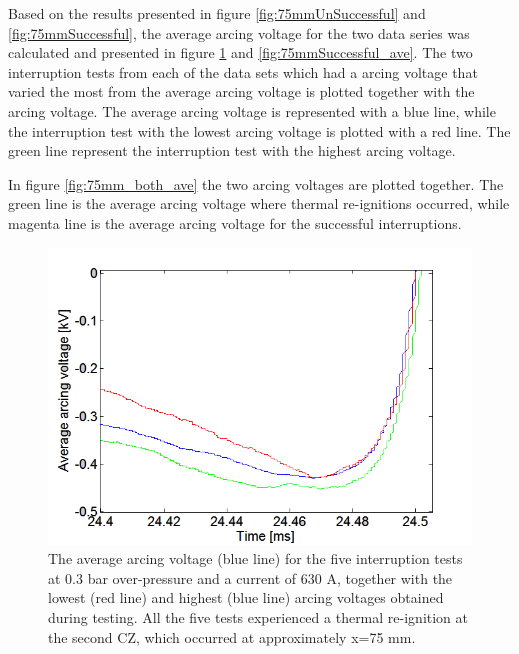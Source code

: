 \documentclass[10pt,b5paper,twoside]{article}
\begin{document}
Based on the results presented in figure \ref{fig:75mmUnSuccessful} and \ref{fig:75mmSuccessful}, the average arcing voltage for the two data series was calculated and presented in figure \ref{fig:75mmUnSuccessful_ave} and \ref{fig:75mmSuccessful_ave}. The two interruption tests from each of the data sets which had a arcing voltage that varied the most from the average arcing voltage is plotted together with the arcing voltage. The average arcing voltage is represented with a blue line, while the interruption test with the lowest arcing voltage is plotted with a red line. The green line represent the interruption test with the highest arcing voltage. 

In figure \ref{fig:75mm_both_ave} the two arcing voltages are plotted together. The green line is the average arcing voltage where thermal re-ignitions occurred, while magenta line is the average arcing voltage for the successful interruptions.

\begin{figure}[H]
\centering
\includegraphics[scale=0.6, angle =0 ]{Bilder/Results/ArcingVoltage_75_reIgnition_average.png}
\caption{The average arcing voltage (blue line) for the five interruption tests at 0.3 bar over-pressure and a current of 630 A, together with the lowest (red line) and highest (blue line) arcing voltages obtained during testing. All the five tests experienced a thermal re-ignition at the second CZ, which occurred at approximately  x=75 mm.} \label{fig:75mmUnSuccessful_ave}
\end{figure}
\end{document}
